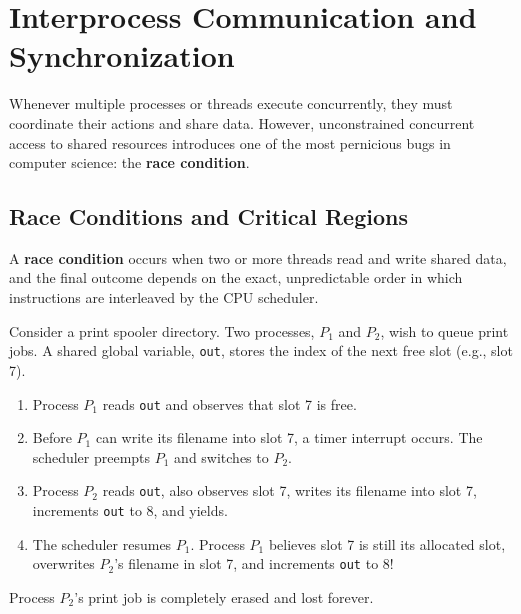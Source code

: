 \section{Interprocess Communication and Synchronization}
\label{sec:ipc_sync}

Whenever multiple processes or threads execute concurrently, they must coordinate their actions and share data. However, unconstrained concurrent access to shared resources introduces one of the most pernicious bugs in computer science: the \textbf{race condition}.

\subsection{Race Conditions and Critical Regions}
A \textbf{race condition} occurs when two or more threads read and write shared data, and the final outcome depends on the exact, unpredictable order in which instructions are interleaved by the CPU scheduler.

\begin{tanenbaumnote}
Consider a print spooler directory. Two processes, $P_1$ and $P_2$, wish to queue print jobs. A shared global variable, \texttt{out}, stores the index of the next free slot (e.g., slot 7).
\begin{enumerate}
    \item Process $P_1$ reads \texttt{out} and observes that slot 7 is free.
    \item Before $P_1$ can write its filename into slot 7, a timer interrupt occurs. The scheduler preempts $P_1$ and switches to $P_2$.
    \item Process $P_2$ reads \texttt{out}, also observes slot 7, writes its filename into slot 7, increments \texttt{out} to 8, and yields.
    \item The scheduler resumes $P_1$. Process $P_1$ believes slot 7 is still its allocated slot, overwrites $P_2$'s filename in slot 7, and increments \texttt{out} to 8!
\end{enumerate}
Process $P_2$'s print job is completely erased and lost forever.
\end{tanenbaumnote}

